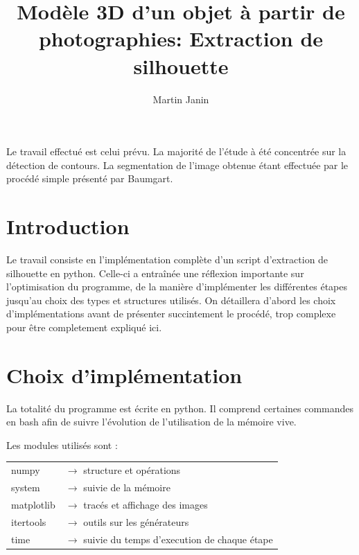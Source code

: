 \documentclass{article}
\author{Martin Janin}
\title{Modèle 3D d'un objet à partir de photographies: Extraction de silhouette}
\begin{document}
\maketitle

Le travail effectué est celui prévu. La majorité de l'étude à été concentrée sur la détection de contours. La segmentation de l'image obtenue étant effectuée par le procédé simple présenté par Baumgart.

\noindent\makebox[\linewidth]{\rule{\textwidth}{0.4pt}}
\vspace{-0.8cm}
\tableofcontents
\noindent\makebox[\linewidth]{\rule{\textwidth}{0.4pt}}

\bigskip
\bigskip

\begin{multicols}{2}

\section{Introduction}

Le travail consiste en l'implémentation complète d'un script d'extraction de silhouette en python. Celle-ci a entraînée une réflexion importante sur l'optimisation du programme, de la manière d'implémenter les différentes étapes jusqu'au choix des types et structures utilisés. On détaillera d'abord les choix d'implémentations avant de présenter succintement le procédé, trop complexe pour être completement expliqué ici.

\section{Choix d'implémentation}

La totalité du programme est écrite en python. Il comprend certaines commandes en bash afin de suivre l'évolution de l'utilisation de la mémoire vive.

Les modules utilisés sont :

\begin{tabular}{l p{5cm}}
	numpy & $\longrightarrow$ structure et opérations \\
	system & $\longrightarrow$ suivie de la mémoire \\
	matplotlib & $\longrightarrow$ tracés et affichage des images \\
	itertools & $\longrightarrow$ outils sur les générateurs \\
	time & $\longrightarrow$ suivie du temps d'execution de chaque étape
\end{tabular}


\end{multicols}
\end{document}
